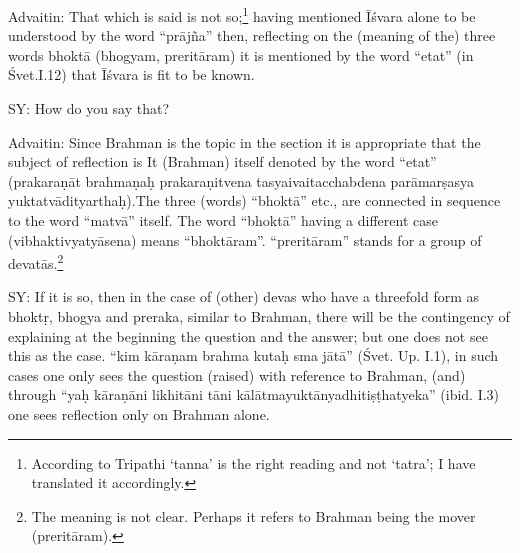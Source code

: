 Advaitin: That which is said is not so;\footnote{According to Tripathi ‘tanna’ is the right reading and not ‘tatra’; I have translated it accordingly.} having mentioned Īśvara alone to be understood by the word “prājña” then, reflecting on the (meaning of the) three words bhoktā (bhogyam, preritāram) it is mentioned by the word “etat” (in Śvet.I.12) that Īśvara is fit to be known. 

\vskip 2pt

SY: How do you say that? 
 
\vskip 2pt

Advaitin: Since Brahman is the topic in the section it is appropriate that the subject of reflection is It (Brahman) itself  denoted by the word “etat” (prakaraṇāt brahmaṇaḥ prakaraṇitvena tasyaivaitacchabdena parāmarṣasya yuktatvādityarthaḥ).The three (words)  “bhoktā” etc., are connected in sequence to  the word “matvā” itself. The word “bhoktā” having a different case (vibhaktivyatyāsena) means “bhoktāram”. “preritāram” stands for a group of devatās.\footnote{The meaning is not clear. Perhaps it refers to Brahman being the mover (preritāram).}

\vskip 2pt

\textbf{}


\newpage



SY: If it is so, then in the case of (other) devas who have a threefold  form as bhoktṛ, bhogya and preraka, similar to Brahman, there will be the contingency of explaining at the beginning the question and the answer; but one does not see this as the case. “kim kāraṇam brahma kutaḥ sma jātā” (Śvet. Up. I.1), in such cases one only sees the question (raised) with reference to Brahman, (and) through “yaḥ kāraṇāni likhitāni tāni kālātmayuktānyadhitiṣṭhatyeka” (ibid. I.3) one sees reflection only on Brahman alone. 

